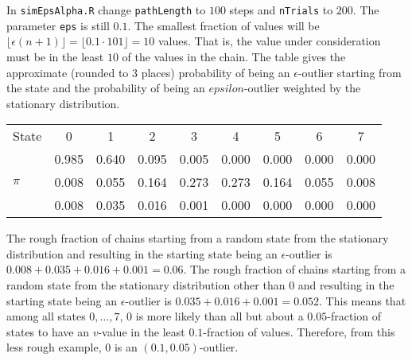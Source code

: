 \documentclass[12pt]{article}
\begin{document}
\begin{solution}
    In \texttt{simEpsAlpha.R} change \lstinline[language=R]{pathLength}
    to \( 100 \) steps and \lstinline[language=R]{nTrials} to \( 200 \).
    The parameter \lstinline[language=R]{eps} is still \( 0.1 \).  The
    smallest fraction of values will be \( \lfloor \epsilon (n+1)
    \rfloor = \lfloor 0.1 \cdot 101 \rfloor = 10 \) values.  That is,
    the value under consideration must be in the least \( 10 \) of the
    values in the chain. The table gives the approximate (rounded to \(
    3 \) places) probability of being an \( \epsilon \)-outlier starting
    from the state and the probability of being an \( epsilon \)-outlier
    weighted by the stationary distribution.
    \begin{table}
        \centering
        \begin{tabular}{l|cccccccc}
            State                                   & 0     & 1     & 2     & 3     & 4      & 5     & 6     & 7     \\ 
                                                    & 0.985 & 0.640 & 0.095 & 0.005 & 0.000  & 0.000 & 0.000 & 0.000 \\ 
            \( \pi \)                               & 0.008 & 0.055 & 0.164 & 0.273 & 0.273  & 0.164 & 0.055 & 0.008 \\ 
                                                    & 0.008 & 0.035 & 0.016 & 0.001 & 0.000  & 0.000 & 0.000 & 0.000 \\ 
        \end{tabular}
    \end{table}

    The rough fraction of chains starting from a random state from the
    stationary distribution and resulting in the starting state being an
    \( \epsilon \)-outlier is \( 0.008 + 0.035 + 0.016 + 0.001 = 0.06 \).
    The rough fraction of chains starting from a random state from the
    stationary distribution other than \( 0 \) and resulting in the
    starting state being an \( \epsilon \)-outlier is \( 0.035 + 0.016 +
    0.001 = 0.052 \).  This means that among all states \( 0, \dots, 7 \),
    \( 0 \) is more likely than all but about a \( 0.05 \)-fraction of
    states to have an \( v \)-value in the least \( 0.1 \)-fraction of
    values.  Therefore, from this less rough example, \( 0 \) is an \( (0.1,
    0.05) \)-outlier.

\end{solution}
\end{document}
